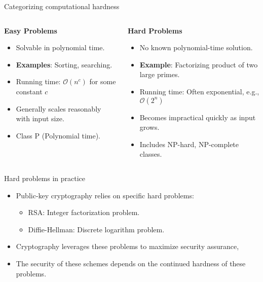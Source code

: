 \documentclass[aspectratio=169, lualatex, handout]{beamer}
\begin{document}
\begin{frame}{Categorizing computational hardness}
	\begin{columns}[c]
		\begin{column}{0.5\textwidth}
			\textbf{Easy Problems}
			\begin{itemize}[<+->]
				\item Solvable in polynomial time.
				\item \textbf{Examples}: Sorting, searching.
				\item Running time: $\mathcal{O}(n^c)$ for some constant $c$
				\item Generally scales reasonably with input size.
				\item Class P (Polynomial time).
			\end{itemize}
		\end{column}
		\begin{column}{0.5\textwidth}
			\textbf{Hard Problems}
			\begin{itemize}[<+->]
				\item No known polynomial-time solution.
				\item \textbf{Example}: Factorizing product of two large primes.
				\item Running time: Often exponential, e.g., $\mathcal{O}(2^n)$
				\item Becomes impractical quickly as input grows.
				\item Includes NP-hard, NP-complete classes.
			\end{itemize}
		\end{column}
	\end{columns}
\end{frame}

\begin{frame}{Hard problems in practice}
	\begin{itemize}
		\item Public-key cryptography relies on specific hard problems:
		      \begin{itemize}
			      \item RSA: Integer factorization problem.
			      \item Diffie-Hellman: Discrete logarithm problem.
		      \end{itemize}
		\item Cryptography leverages these problems to maximize security assurance,
		\item The security of these schemes depends on the continued hardness of these problems.
	\end{itemize}
\end{frame}
\end{document}
